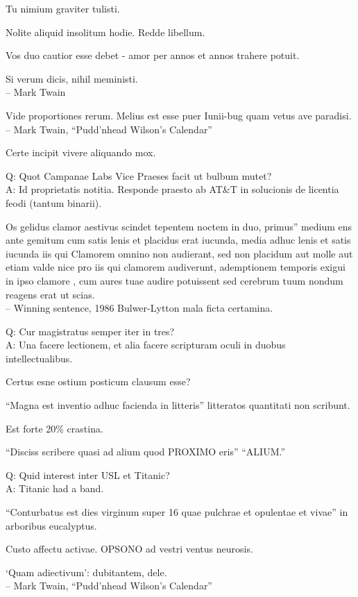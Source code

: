 \documentclass[titlepage,12pt]{memoir}
\begin{document}
Tu nimium graviter tulisti.

Nolite aliquid insolitum hodie. Redde libellum.

Vos duo cautior esse debet - amor per annos et annos trahere potuit.

Si verum dicis, nihil meministi.
\\-- Mark Twain

Vide proportiones rerum. Melius est esse puer Iunii-bug
quam vetus ave paradisi.
\\-- Mark Twain, “Pudd’nhead Wilson’s Calendar”

Certe incipit vivere aliquando mox.

Q: Quot Campanae Labs Vice Praeses facit ut bulbum mutet?\\
A: Id proprietatis notitia. Responde praesto ab AT\&T in solucionis
de licentia feodi (tantum binarii).

Os gelidus clamor aestivus scindet tepentem noctem in duo, primus”
medium ens ante gemitum cum satis lenis et placidus erat
iucunda, media adhuc lenis et satis iucunda iis qui
Clamorem omnino non audierant, sed non placidum aut molle aut etiam valde nice
pro iis qui clamorem audiverunt, ademptionem temporis exigui
in ipso clamore , cum aures tuae audire potuissent
sed cerebrum tuum nondum reagens erat ut scias.
\\-- Winning sentence, 1986 Bulwer-Lytton mala ficta certamina.

Q: Cur magistratus semper iter in tres?\\
A: Una facere lectionem, et alia facere scripturam
oculi in duobus intellectualibus.

 Certus esne ostium posticum clausum esse?

“Magna est inventio adhuc facienda in litteris”
litteratos quantitati non scribunt.

Est forte 20\% crastina.

“Disciss scribere quasi ad alium quod PROXIMO eris”
“ALIUM.”

Q: Quid interest inter USL et Titanic?\\
A: Titanic had a band.

“Conturbatus est dies virginum super 16 quae pulchrae et opulentae et vivae”
in arboribus eucalyptus.

Custo affectu activae. OPSONO ad vestri ventus neurosis.

‘Quam adiectivum’: dubitantem, dele.
\\-- Mark Twain, “Pudd’nhead Wilson’s Calendar”
\end{document}
